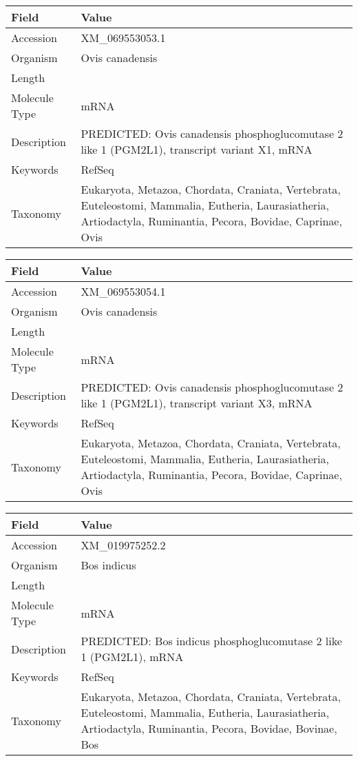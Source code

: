 \documentclass[10pt]{article}
\begin{document}
\vspace{1em}
{\footnotesize
\begin{longtable}{>{\raggedright\arraybackslash}p{4.5cm} >{\raggedright\arraybackslash}p{11.5cm}}
\textbf{Field} & \textbf{Value} \\
\hline
Accession & XM\_069553053.1 \\
Organism & Ovis canadensis \\
Length & 3150 \\
Molecule Type & mRNA \\
Description & PREDICTED: Ovis canadensis phosphoglucomutase 2 like 1 (PGM2L1), transcript variant X1, mRNA \\
Keywords & RefSeq \\
Taxonomy & Eukaryota, Metazoa, Chordata, Craniata, Vertebrata, Euteleostomi, Mammalia, Eutheria, Laurasiatheria, Artiodactyla, Ruminantia, Pecora, Bovidae, Caprinae, Ovis \\
\end{longtable}
}

\vspace{1em}
{\footnotesize
\begin{longtable}{>{\raggedright\arraybackslash}p{4.5cm} >{\raggedright\arraybackslash}p{11.5cm}}
\textbf{Field} & \textbf{Value} \\
\hline
Accession & XM\_069553054.1 \\
Organism & Ovis canadensis \\
Length & 4726 \\
Molecule Type & mRNA \\
Description & PREDICTED: Ovis canadensis phosphoglucomutase 2 like 1 (PGM2L1), transcript variant X3, mRNA \\
Keywords & RefSeq \\
Taxonomy & Eukaryota, Metazoa, Chordata, Craniata, Vertebrata, Euteleostomi, Mammalia, Eutheria, Laurasiatheria, Artiodactyla, Ruminantia, Pecora, Bovidae, Caprinae, Ovis \\
\end{longtable}
}

\vspace{1em}
{\footnotesize
\begin{longtable}{>{\raggedright\arraybackslash}p{4.5cm} >{\raggedright\arraybackslash}p{11.5cm}}
\textbf{Field} & \textbf{Value} \\
\hline
Accession & XM\_019975252.2 \\
Organism & Bos indicus \\
Length & 7802 \\
Molecule Type & mRNA \\
Description & PREDICTED: Bos indicus phosphoglucomutase 2 like 1 (PGM2L1), mRNA \\
Keywords & RefSeq \\
Taxonomy & Eukaryota, Metazoa, Chordata, Craniata, Vertebrata, Euteleostomi, Mammalia, Eutheria, Laurasiatheria, Artiodactyla, Ruminantia, Pecora, Bovidae, Bovinae, Bos \\
\end{longtable}
}
\end{document}
